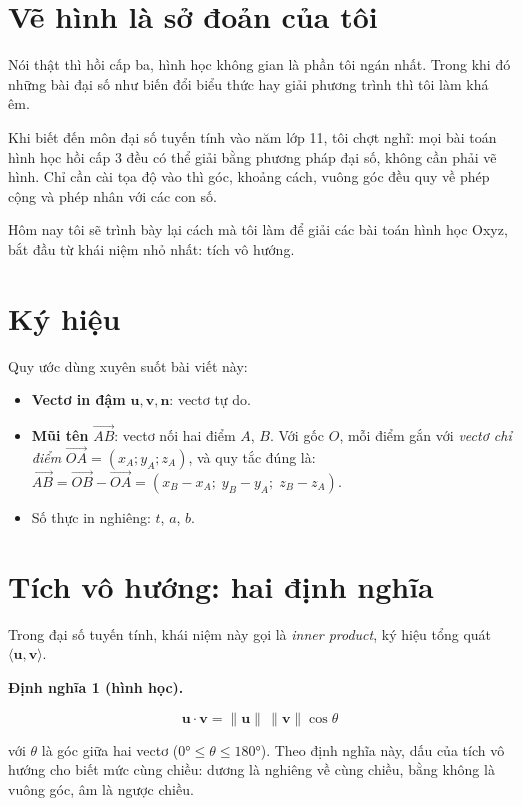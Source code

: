 \documentclass[12pt,a4paper]{article}
\begin{document}
\section{Vẽ hình là sở đoản của tôi}

Nói thật thì hồi cấp ba, hình học không gian là phần tôi ngán nhất. Trong khi đó những bài đại số như biến đổi biểu thức hay giải phương trình thì tôi làm khá êm.

Khi biết đến môn đại số tuyến tính vào năm lớp 11, tôi chợt nghĩ: mọi bài toán hình học hồi cấp 3 đều có thể giải bằng phương pháp đại số, không cần phải vẽ hình. Chỉ cần cài tọa độ vào thì góc, khoảng cách, vuông góc đều quy về phép cộng và phép nhân với các con số.

Hôm nay tôi sẽ trình bày lại cách mà tôi làm để giải các bài toán hình học Oxyz, bắt đầu từ khái niệm nhỏ nhất: tích vô hướng.

\section{Ký hiệu}

Quy ước dùng xuyên suốt bài viết này:

\begin{itemize}
  \item \textbf{Vectơ in đậm} $\mathbf{u}, \mathbf{v}, \mathbf{n}$: vectơ tự do.
  \item \textbf{Mũi tên} $\overrightarrow{AB}$: vectơ nối hai điểm $A$, $B$. Với gốc $O$, mỗi điểm gắn với \emph{vectơ chỉ điểm} $\overrightarrow{OA} = (x_A;y_A;z_A)$, và quy tắc đúng là:
        $\overrightarrow{AB} = \overrightarrow{OB} - \overrightarrow{OA}
        = (x_B-x_A;\; y_B-y_A;\; z_B-z_A)$.
  \item Số thực in nghiêng: $t$, $a$, $b$.
\end{itemize}

\section{Tích vô hướng: hai định nghĩa}

Trong đại số tuyến tính, khái niệm này gọi là \emph{inner product}, ký hiệu tổng quát $\langle \mathbf{u}, \mathbf{v} \rangle$.

\textbf{Định nghĩa 1 (hình học).}

$$
\mathbf{u} \cdot \mathbf{v} = \|\mathbf{u}\|\,\|\mathbf{v}\|\cos\theta
$$

với $\theta$ là góc giữa hai vectơ ($0° \le \theta \le 180°$). Theo định nghĩa này, dấu của tích vô hướng cho biết mức cùng chiều: dương là nghiêng về cùng chiều, bằng không là vuông góc, âm là ngược chiều.
\end{document}
